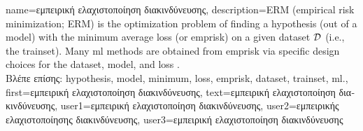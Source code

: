 {name={\foreignlanguage{greek}{εμπειρική ελαχιστοποίηση διακινδύνευσης}}, 
	description={ERM (empirical risk minimization; ERM) is the optimization problem of finding 
		a \gls{hypothesis} (out of a \gls{model}) with the \gls{minimum} average \gls{loss} (or \gls{emprisk}) on a given \gls{dataset} 
		$\mathcal{D}$ (i.e., the \gls{trainset}). Many \gls{ml} methods are obtained from 
		\gls{emprisk} via specific design choices for the \gls{dataset}, \gls{model}, and \gls{loss} \cite[Ch. 3]{MLBasics}.\\
		\foreignlanguage{greek}{Βλέπε επίσης:} \gls{hypothesis}, \gls{model}, \gls{minimum}, \gls{loss}, \gls{emprisk}, \gls{dataset}, \gls{trainset}, \gls{ml}.},
	first={\foreignlanguage{greek}{εμπειρική ελαχιστοποίηση διακινδύνευσης}},
	text={\foreignlanguage{greek}{εμπειρική ελαχιστοποίηση διακινδύνευσης}},
	user1={\foreignlanguage{greek}{εμπειρική ελαχιστοποίηση διακινδύνευσης}}, %
	user2={\foreignlanguage{greek}{εμπειρικής ελαχιστοποίησης διακινδύνευσης}}, %
	user3={\foreignlanguage{greek}{εμπειρική ελαχιστοποίηση διακινδύνευσης}} %
}


